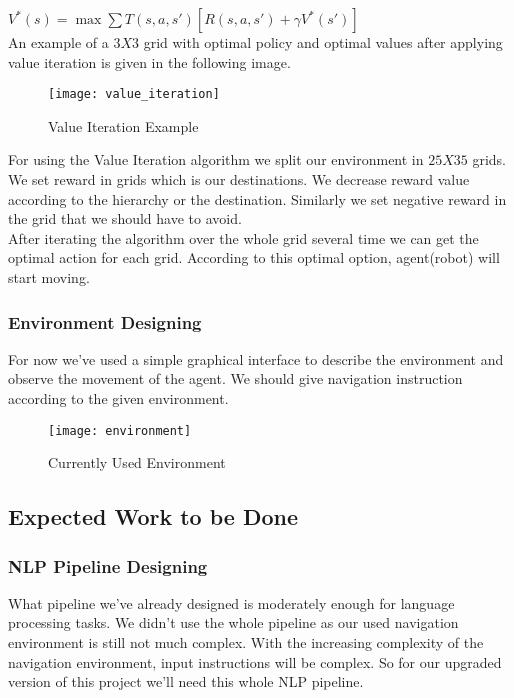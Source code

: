 $V^*(s) = \max \sum T(s, a, s')[R(s, a, s')  + \gamma V^*(s')]$\\

An example of a $3 X 3$ grid with optimal policy and optimal values after applying value iteration is given in the following image.\\


\begin{figure}[ht]
    \centering
    \texttt{[image: value\_iteration]}
    \caption{Value Iteration Example}
\end{figure}
\vline

For using the Value Iteration algorithm we split our environment in $25 X 35$ grids. We set reward in grids which is our destinations. We decrease reward value according to the hierarchy or the destination. Similarly we set negative reward in the grid that we should have to avoid.\\

After iterating the algorithm over the whole grid several time we can get the optimal action for each grid. According to this optimal option, agent(robot) will start moving.\\


\subsubsection{Environment Designing}
For now we've used a simple graphical interface to describe the environment and observe the movement of the agent. We should give navigation instruction according to the given environment.

\begin{figure}[h]
    \centering
    \texttt{[image: environment]}
    \caption{Currently Used Environment}
\end{figure}
\vline

\subsection{Expected Work to be Done}

\subsubsection{NLP Pipeline Designing}
What pipeline we've already designed is moderately enough for language processing tasks. We didn't use the whole pipeline as our used navigation environment is still not much complex. With the increasing complexity of the navigation environment, input instructions will be complex. So for our upgraded version of this project we'll need this whole NLP pipeline.\\

